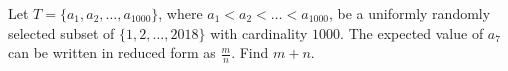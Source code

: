 Let $T=\{a_1,a_2,\dots,a_{1000}\}$,  where $a_1<a_2<\dots<a_{1000}$,  be a uniformly randomly selected subset of $\{1,2,\dots,2018\}$ with cardinality $1000$. The expected value of $a_7$ can be written in reduced form as $\tfrac{m}{n}$. Find $m+n$.